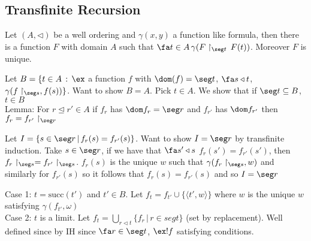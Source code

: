 
\subsection{Transfinite Recursion}

\begin{theorem}
    Let $(A, \triangleleft)$ be a well ordering and $\gamma(x,y)$ a function like formula, then there is a function $F$ with domain $A$ such that $\fa t \in A \, \gamma(F \upharpoonright_{\seg t}\, F(t))$. Moreover $F$ is unique. 
\end{theorem}

\begin{pf}
    Let $B = \{t \in A \, : \, \ex$ a function $f$ with $\dom(f) = \seg t$, $\fa s \triangleleft t$, $\gamma(f \upharpoonright_{\seg s}, f(s))\}$. Want to show $B = A$. Pick $t \in A$. We show that if $\seg t \subseteq B$, $t \in B$ \\
    Lemma: For $r \trianglelefteq r' \in A$ if $f_r$ has $\dom f_r = \seg r$ and $f_{r'}$ has $\dom f_{r'}$ then $f_r = f_{r'} \upharpoonright_{\seg r}$ \\ 
    \begin{pf}
        Let $I = \{s \in \seg r \, | \, f_r(s) = f_{r'}(s) \}$. Want to show $I = \seg r$ by transfinite induction. Take $s \in \seg r$, if we have that $\fa s' \triangleleft s$ $f_r(s') = f_{r'}(s')$, then $f_r \upharpoonright_{\seg s} = f_{r'} \upharpoonright_{\seg s}$. $f_r(s)$ is the unique $w$ such that $\gamma(f_r \upharpoonright_{\seg s}, w)$ and similarly for $f_{r'}(s)$ so it follows that $f_r(s) = f_{r'}(s)$ and so $I = \seg r$ 
    \end{pf}
    Case 1: $t = \text{succ}(t')$ and $t' \in B$. Let $f_t = f_{t'} \cup \{\langle t', w \rangle \}$ where $w$ is the unique $w$ satisfying $\gamma(f_{t'}, \omega)$ \\
    Case 2: $t$ is a limit. Let $f_t = \bigcup_{r \triangleleft t} \{f_r \, | \, r \in seg t\}$ (set by replacement). Well defined since by IH since $\fa r \in \seg t$, $\ex ! f$ satisfying conditions. 
\end{pf}

